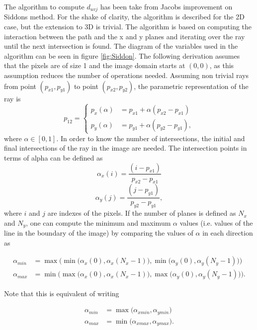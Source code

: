 The algorithm to compute $d_{uvj}$ has been take from Jacobs\cite{jacobs1998fast} improvement on Siddons method\cite{siddon1985fast}. For the shake of clarity, the algorithm is described for the 2D case, but the extension to 3D is trivial. The algorithm is based on computing the interaction between the path and the x and y planes and iterating over the ray until the next intersection is found. The diagram of the variables used in the algorithm can be seen in figure \ref{fig:Siddon}. The following derivation assumes that the pixels are of size 1 and the image domain starts at $(0,0)$, as this assumption reduces the number of operations needed. Assuming non trivial rays from point $(p_{x1},p_{y1})$ to point $(p_{x2},p_{y2})$, the parametric representation of the ray is
\begin{equation}
p_{12}=
\begin{cases}
      p_x(\alpha)&=p_{x1}+\alpha (p_{x2}-p_{x1})\\
      p_y(\alpha)&=p_{y1}+\alpha (p_{y2}-p_{y1}),\label{eq:line}
    \end{cases}
\end{equation}
where $\alpha \in [0,1]$. In order to know the number of intersections, the initial and final intersections of the ray in the image are needed. The intersection points in terms of alpha can be defined as
\begin{equation}
\alpha_x(i) = \frac{(i-p_{x1})}{p_{x2}-p_{x1}}\label{eq:alphax}
\end{equation}
\begin{equation}
\alpha_y(j) = \frac{(j-p_{y1})}{p_{y2}-p_{y1}},\label{eq:alphay}
\end{equation}
where $i$ and $j$ are indexes of the pixels. If the number of planes is defined as $N_x$ and $N_y$, one can compute the minimum and maximum $\alpha$ values (i.e. values of the line in the boundary of the image) by comparing the values of $\alpha$ in each direction as

\begin{align}
\alpha_{min}&=\max \Big(\min \big(\alpha_x(0),\alpha_x(N_x-1)  \big), \min \big(\alpha_y(0),\alpha_y(N_y-1)  \big) \Big)\\
\alpha_{max}&=\min \Big(\max \big(\alpha_x(0),\alpha_x(N_x-1)  \big), \max \big(\alpha_y(0),\alpha_y(N_y-1)  \big) \Big).
\end{align}

Note that this is equivalent of writing

\begin{align}
\alpha_{min}&=\max \Big( \alpha_{xmin},\alpha_{ymin} \Big)\\
\alpha_{max}&=\min \Big( \alpha_{xmax},\alpha_{ymax}\Big).
\end{align}

